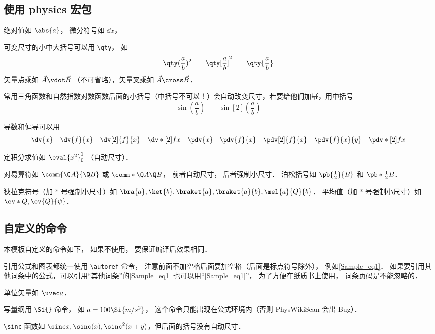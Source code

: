 \subsection{使用 physics 宏包}
绝对值如 $\abs{a}$， 微分符号如 $\dd{x}$， 

可变尺寸的小中大括号可以用 \lstinline|\qty|， 如
\begin{equation}
\qty(\frac ab)^2 \qquad \qty[\frac ab]^2 \qquad \qty{ \frac ab}
\end{equation}
矢量点乘如 $\vec A \vdot \vec B$ （不可省略），矢量叉乘如 $\vec A\cross\vec B$．

常用三角函数和自然指数对数函数后面的小括号（中括号不可以！）会自动改变尺寸，若要给他们加幂，用中括号
\begin{equation}
\sin(\frac ab) \qquad \sin[2](\frac ab)
\end{equation}

导数和偏导可以用
\begin{equation}
\dv{x} \quad \dv{f}{x} \quad \dv[2]{f}{x} \quad \dv*[2]{f}{x} \quad
\pdv{x} \quad \pdv{f}{x} \quad \pdv[2]{f}{x} \quad \pdv{f}{x}{y} \quad \pdv*[2]{f}{x}
\end{equation}

定积分求值如 $\eval{x^2}_0^1$ （自动尺寸）．

对易算符如 $\comm{\Q A}{\Q B}$ 或 $\comm*{\Q A}{\Q B}$， 前者自动尺寸， 后者强制小尺寸． 泊松括号如 $\pb{\frac12}{B}$ 和 $\pb*{\frac12}{B}$．

狄拉克符号（加 * 号强制小尺寸）如 $\bra{a}, \ket{b}, \braket{a}, \braket{a}{b}, \mel{a}{Q}{b}$． 平均值（加 * 号强制小尺寸）如 $\ev*{Q}, \ev{Q}{\psi}$．

\subsection{自定义的命令}
本模板自定义的命令如下， 如果不使用， 要保证编译后效果相同．

引用公式和图表都统一使用 \lstinline|\autoref| 命令， 注意前面不加空格后面要加空格（后面是标点符号除外）， 例如\autoref{Sample_eq1}． 如果要引用其他词条中的公式，可以引用“其他词条”的\autoref{Sample_eq1} 也可以用“\autoref{Sample_eq1}”， 为了方便在纸质书上使用， 词条页码是不能忽略的．

单位矢量如 $\uvec a$．

写量纲用 \lstinline|\Si{}| 命令， 如 $a = 100\Si{m/s^2}$， 这个命令只能出现在公式环境内（否则 PhysWikiScan 会出 Bug）．

 \lstinline|\sinc| 函数如 $\sinc x, \sinc(x), \sinc^2(x+y)$，但后面的括号没有自动尺寸．
 

